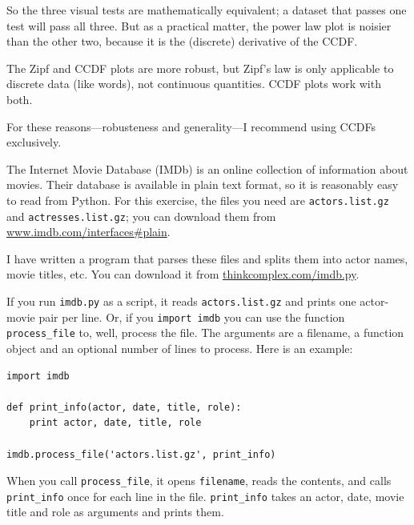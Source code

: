 \documentclass[10pt]{book}
\begin{document}
So the three visual tests are mathematically equivalent; a dataset
that passes one test will pass all three.  But as a practical
matter, the power law plot is noisier than the other two, because
it is the (discrete) derivative of the CCDF.

The Zipf and CCDF plots are more robust, but Zipf's law is only
applicable to discrete data (like words), not continuous quantities.
CCDF plots work with both.

For these reasons---robusteness and generality---I recommend
using CCDFs exclusively.



\begin{ex}


The Internet Movie Database (IMDb) is an online collection of
information about movies.  Their database is available
in plain text format, so it is reasonably easy to read from
Python.  For this exercise, the files you need
are {\tt actors.list.gz} and {\tt actresses.list.gz}; you
can download them from \url{www.imdb.com/interfaces#plain}.


I have written a program that parses these files and
splits them into actor names, movie titles, etc.  You can
download it from \url{thinkcomplex.com/imdb.py}.

If you run {\tt imdb.py} as a script, it reads {\tt actors.list.gz}
and prints one actor-movie pair per line.  Or, if you {\tt import
imdb} you can use the function \verb"process_file" to, well,
process the file.  The arguments are a filename, a function
object and an optional number of lines to process.  Here is
an example:

\beforeverb
\begin{verbatim}
import imdb

def print_info(actor, date, title, role):
    print actor, date, title, role

imdb.process_file('actors.list.gz', print_info)
\end{verbatim}
\afterverb

When you call \verb"process_file", it opens {\tt filename}, reads the
contents, and calls \verb"print_info" once for each line in the file.
\verb"print_info" takes an actor, date, movie title and role as
arguments and prints them.

\begin{enumerate}


\end{enumerate}
\end{ex}
\end{document}
